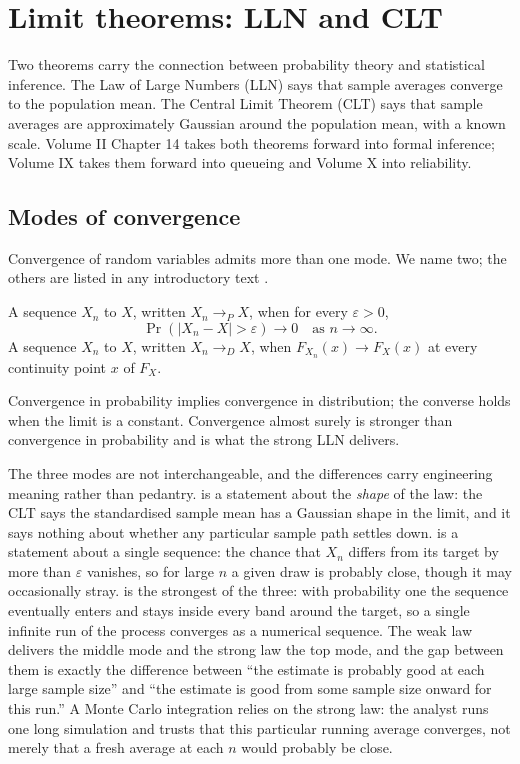 \section{Limit theorems: LLN and CLT}

Two theorems carry the connection between probability theory and
statistical inference. The Law of Large Numbers (LLN) says that
sample averages converge to the population mean. The Central Limit
Theorem (CLT) says that sample averages are approximately Gaussian
around the population mean, with a known scale. Volume II Chapter
14 takes both theorems forward into formal inference; Volume IX
takes them forward into queueing and Volume X into reliability.

\subsection{Modes of convergence}

Convergence of random variables admits more than one mode. We name
two; the others are listed in any introductory text
\cite[ch.~5]{text:wasserman2004}.

A sequence $X_{n}$  to $X$, written
$X_{n} \to_{P} X$, when for every $\varepsilon > 0$,
\[
\Pr(|X_{n} - X| > \varepsilon) \to 0 \quad\text{as } n \to \infty.
\]
A sequence $X_{n}$  to $X$,
written $X_{n} \to_{D} X$, when $F_{X_{n}}(x) \to F_{X}(x)$ at every
continuity point $x$ of $F_{X}$.

Convergence in probability implies convergence in distribution; the
converse holds when the limit is a constant. Convergence almost
surely is stronger than convergence in probability and is what the
strong LLN delivers.

The three modes are not interchangeable, and the differences carry
engineering meaning rather than pedantry.  is a statement about the \emph{shape} of the law: the CLT
says the standardised sample mean has a Gaussian shape in the limit, and
it says nothing about whether any particular sample path settles down.
 is a statement about a single
sequence: the chance that $X_{n}$ differs from its target by more than
$\varepsilon$ vanishes, so for large $n$ a given draw is probably close,
though it may occasionally stray.  is
the strongest of the three: with probability one the sequence eventually
enters and stays inside every band around the target, so a single
infinite run of the process converges as a numerical sequence. The
weak law delivers the middle mode and the strong law the top mode, and
the gap between them is exactly the difference between ``the estimate is
probably good at each large sample size'' and ``the estimate is good from
some sample size onward for this run.'' A Monte Carlo integration relies
on the strong law: the analyst runs one long simulation and trusts that
this particular running average converges, not merely that a fresh
average at each $n$ would probably be close.

